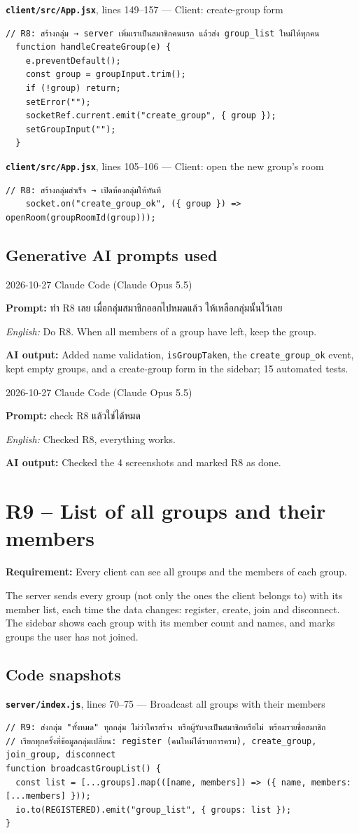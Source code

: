 \documentclass[11pt,a4paper]{article}
\newcommand{\code}[1]{\texttt{#1}}
\newcommand{\req}[1]{\begin{tcolorbox}[colback=accent!6,colframe=accent!60,boxrule=0.5pt,left=4pt,right=4pt,top=2pt,bottom=2pt]\textbf{Requirement:} #1\end{tcolorbox}}
\newcommand{\snap}[3]{\par\medskip\textbf{\code{#1}}, lines #2 --- #3}
\newcommand{\promptbox}[4]{%
\begin{tcolorbox}[colback=codebg,colframe=gray!50,boxrule=0.4pt,left=4pt,right=4pt,top=2pt,bottom=2pt]
{\small #1 \quad Claude Code (Claude Opus 5.5)}\par
\textbf{Prompt:} #2\par
\textit{English:} #3\par
\textbf{AI output:} #4
\end{tcolorbox}}
\begin{document}
\snap{client/src/App.jsx}{149--157}{Client: create-group form}
\begin{Verbatim}[firstnumber=149]
  // R8: สร้างกลุ่ม → server เพิ่มเราเป็นสมาชิกคนแรก แล้วส่ง group_list ใหม่ให้ทุกคน
  function handleCreateGroup(e) {
    e.preventDefault();
    const group = groupInput.trim();
    if (!group) return;
    setError("");
    socketRef.current.emit("create_group", { group });
    setGroupInput("");
  }
\end{Verbatim}

\snap{client/src/App.jsx}{105--106}{Client: open the new group's room}
\begin{Verbatim}[firstnumber=105]
    // R8: สร้างกลุ่มสำเร็จ → เปิดห้องกลุ่มให้ทันที
    socket.on("create_group_ok", ({ group }) => openRoom(groupRoomId(group)));
\end{Verbatim}

\subsection*{Generative AI prompts used}
\promptbox{2026-10-27}{ทำ R8 เลย เมื่อกลุ่มสมาชิกออกไปหมดแล้ว ให้เหลือกลุ่มนั้นไว้เลย}{Do R8. When all members of a group have left, keep the group.}{Added name validation, \code{isGroupTaken}, the \code{create\_group\_ok} event, kept empty groups, and a create-group form in the sidebar; 15 automated tests.}
\promptbox{2026-10-27}{check R8 แล้วใช่ได้หมด}{Checked R8, everything works.}{Checked the 4 screenshots and marked R8 as done.}

\clearpage
\section{R9 -- List of all groups and their members}
\req{Every client can see all groups and the members of each group.}

The server sends every group (not only the ones the client belongs to) with its
member list, each time the data changes: register, create, join and disconnect. The sidebar shows
each group with its member count and names, and marks groups the user has not joined.

\subsection*{Code snapshots}
\snap{server/index.js}{70--75}{Broadcast all groups with their members}
\begin{Verbatim}[firstnumber=70]
// R9: ส่งกลุ่ม "ทั้งหมด" ทุกกลุ่ม ไม่ว่าใครสร้าง หรือผู้รับจะเป็นสมาชิกหรือไม่ พร้อมรายชื่อสมาชิก
// เรียกทุกครั้งที่ข้อมูลกลุ่มเปลี่ยน: register (คนใหม่ได้รายการครบ), create_group, join_group, disconnect
function broadcastGroupList() {
  const list = [...groups].map(([name, members]) => ({ name, members: [...members] }));
  io.to(REGISTERED).emit("group_list", { groups: list });
}
\end{Verbatim}
\end{document}
